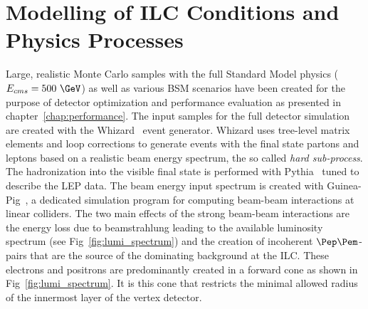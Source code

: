 \section{\label{sec:generator} Modelling of ILC Conditions and Physics Processes}
%
%
Large, realistic Monte Carlo samples with the full Standard Model physics ($E_{cms}=500~\GeV$) as well as various
BSM scenarios have been created for the purpose of detector optimization and performance evaluation as
presented in chapter~\ref{chap:performance}. The input samples for the full detector simulation
are created with the Whizard~\cite{Kilian:2007gr} event generator.
Whizard uses tree-level matrix elements and loop corrections to generate events with the final state partons and leptons
based on a realistic beam energy spectrum, the so called \emph{hard sub-process}. The hadronization into the visible final state
is performed with Pythia~\cite{Sjostrand:2006za} tuned to describe the LEP data.
The beam energy input spectrum is created with Guinea-Pig~\cite{Schulte:1998au}, a dedicated simulation program for computing
beam-beam interactions at linear colliders. The two main effects of the strong beam-beam interactions are the energy loss due to
beamstrahlung leading to the available luminosity spectrum (see Fig~\ref{fig:lumi_spectrum}) and the creation of
incoherent $\Pep\Pem$-pairs that are the source of the dominating background at the ILC.
These electrons and positrons are predominantly created in a forward cone as shown in Fig~\ref{fig:lumi_spectrum}. It is this cone that restricts the minimal
allowed radius of the innermost layer of the vertex detector.
%

